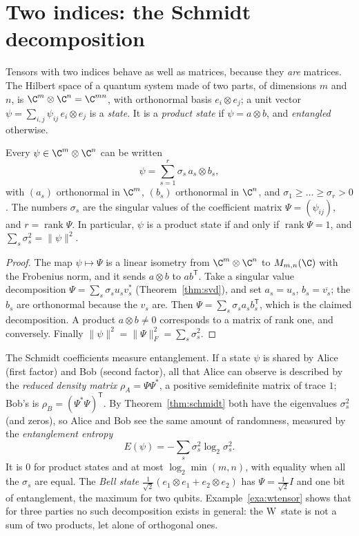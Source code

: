 \section{Two indices: the Schmidt decomposition}

Tensors with two indices behave as well as matrices, because they \emph{are} matrices. The Hilbert space of a quantum system made of
two parts, of dimensions $m$ and $n$, is $\C^m\otimes\C^n=\C^{mn}$, with orthonormal basis $e_i\otimes e_j$; a unit vector $\psi=\sum_{i,j}
\psi_{ij}\,e_i\otimes e_j$ is a \emph{state}. It is a \emph{product state} if $\psi=a\otimes b$, and \emph{entangled} otherwise.

\begin{theorem}\label{thm:schmidt}
Every $\psi\in\C^m\otimes\C^n$ can be written
\[
\psi=\sum_{s=1}^r\sigma_s\,a_s\otimes b_s,
\]
with $(a_s)$ orthonormal in $\C^m$, $(b_s)$ orthonormal in $\C^n$, and $\sigma_1\ge\dots\ge\sigma_r>0$. The numbers $\sigma_s$ are the
singular values of the coefficient matrix $\Psi=(\psi_{ij})$, and $r=\operatorname{rank}\Psi$. In particular, $\psi$ is a product
state if and only if $\operatorname{rank}\Psi=1$, and $\sum_s\sigma_s^2=\|\psi\|^2$.
\end{theorem}
\begin{proof}
The map $\psi\mapsto\Psi$ is a linear isometry from $\C^m\otimes\C^n$ to $M_{m,n}(\C)$ with the Frobenius norm, and it sends $a\otimes b$
to $ab^{\mathsf T}$. Take a singular value decomposition $\Psi=\sum_s\sigma_su_sv_s^*$ (Theorem~\ref{thm:svd}), and set $a_s=u_s$,
$b_s=\overline{v_s}$; the $b_s$ are orthonormal because the $v_s$ are. Then $\Psi=\sum_s\sigma_sa_sb_s^{\mathsf T}$, which is the
claimed decomposition. A product $a\otimes b\ne0$ corresponds to a matrix of rank one, and conversely. Finally $\|\psi\|^2=
\|\Psi\|_F^2=\sum_s\sigma_s^2$.
\end{proof}

The Schmidt coefficients measure entanglement. If a state $\psi$ is shared by Alice (first factor) and Bob (second factor), all
that Alice can observe is described by the \emph{reduced density matrix} $\rho_A=\Psi\Psi^*$, a positive semidefinite matrix of trace
$1$; Bob's is $\rho_B=(\Psi^*\Psi)^{\mathsf T}$. By Theorem~\ref{thm:schmidt} both have the eigenvalues $\sigma_s^2$ (and zeros), so
Alice and Bob see the same amount of randomness, measured by the \emph{entanglement entropy}
\[
E(\psi)=-\sum_s\sigma_s^2\log_2\sigma_s^2.
\]
It is $0$ for product states and at most $\log_2\min(m,n)$, with equality when all the $\sigma_s$ are equal. The \emph{Bell state}
$\frac1{\sqrt2}(e_1\otimes e_1+e_2\otimes e_2)$ has $\Psi=\frac1{\sqrt2}I$ and one bit of entanglement, the maximum for two qubits.
Example~\ref{exa:wtensor} shows that for three parties no such decomposition exists in general: the W~state is not a sum of two
products, let alone of orthogonal ones.


